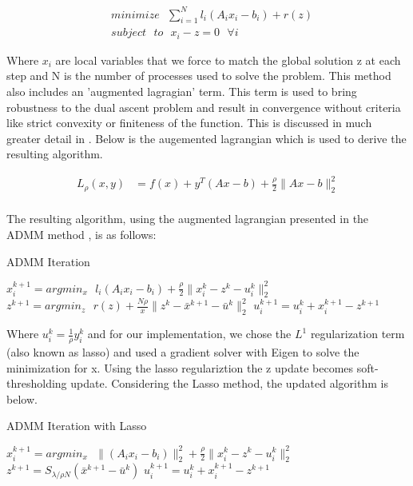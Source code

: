 \documentclass[letterpaper,12pt,onecolumn]{article}
\begin{document}
\begin{center}
\begin{align}
	&minimize \: \: \: \sum_{i=1}^{N} l_{i}(A_{i}x_{i} - b_{i}) + r(z) \\
	&subject \: \: \: to \: \: \: x_{i} - z = 0 \: \: \: \forall i
\end{align}
\end{center}
Where $x_{i}$ are local variables that we force to match the global solution z at each step and N is the number of processes used to solve the problem. This method also includes an 'augmented lagragian' term. This term is used to bring robustness to the dual ascent problem and result in convergence without criteria like strict convexity or finiteness of the function. This is discussed in much greater detail in \cite{ADMM}. Below is the augemented lagrangian which is used to derive the resulting algorithm.
\newline
\begin{center}
  \begin{align}
		L_{\rho}(x,y) &= f(x) + y^{T}(Ax-b) + \frac{\rho}{2}\|Ax - b\|_{2}^{2} \\
  \end{align}
\end{center}


The resulting algorithm, using the augmented lagrangian presented in the ADMM method \cite{ADMM}, is as follows:

\begin{center}
\begin{algorithm}
\caption{ADMM Iteration}
\begin{algorithmic}[1]
	\STATE $x_{i}^{k+1} = argmin_{x} \: \: \: l_{i}(A_{i}x_{i} - b_{i}) + \frac{\rho}{2} \| x_{i}^{k} - z^{k} - u_{i}^{k} \|_{2}^{2}$ 
	\STATE $z^{k+1} = argmin_{z} \: \: \: r(z) + \frac{N \rho}{x} \| z^{k} - \bar{x}^{k+1} - \bar{u}^{k} \|_{2}^{2} $
	\STATE $u_{i}^{k+1} = u_{i}^{k} + x_{i}^{k+1} - z^{k+1} $ 
  \end{algorithmic}
\end{algorithm}
\end{center}

Where $u_{i}^{k} = \frac{1}{\rho} y_{i}^{k}$ and for our implementation, we chose the $L^{1}$ regularization term (also known as lasso) and used a gradient solver with Eigen to solve the minimization for x. Using the lasso regulariztion the z update becomes soft-thresholding update. Considering the Lasso method, the updated algorithm is below.

\begin{center}
\begin{algorithm}
\caption{ADMM Iteration with Lasso}
\begin{algorithmic}[1]
  \STATE $x_{i}^{k+1} = argmin_{x} \: \: \: \|(A_{i}x_{i} - b_{i})\|_{2}^{2} + \frac{\rho}{2} \| x_{i}^{k} - z^{k} - u_{i}^{k} \|_{2}^{2}$ 
  \STATE $z^{k+1} = S_{\lambda/\rho N} (\bar{x}^{k+1} - \bar{u}^{k})$
	\STATE $u_{i}^{k+1} = u_{i}^{k} + x_{i}^{k+1} - z^{k+1} $ 
  \end{algorithmic}
\end{algorithm}
\end{center}
\end{document}
